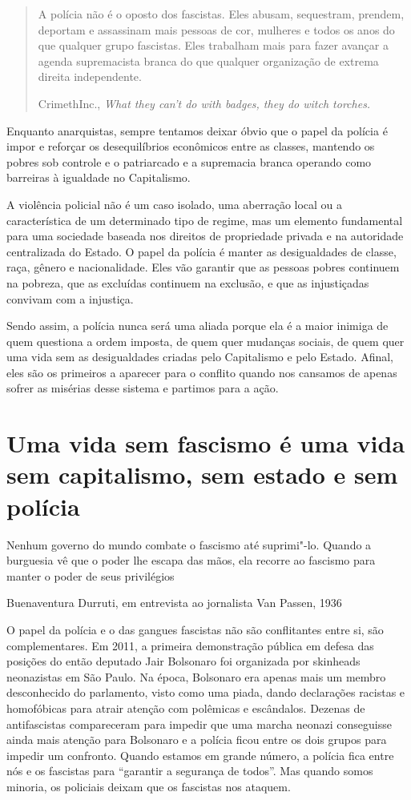 \begin{quote}
A polícia não é o oposto dos fascistas. Eles abusam, sequestram, prendem, deportam e assassinam mais pessoas de cor, mulheres e  todos os anos do que qualquer grupo fascistas. Eles trabalham mais para fazer avançar a agenda supremacista branca do que qualquer organização de extrema direita independente.

CrimethInc., \emph{What they can't do with badges, they do witch torches.}
\end{quote}

Enquanto anarquistas, sempre tentamos deixar óbvio que o papel da polícia é impor e reforçar os desequilíbrios econômicos entre as classes, mantendo os pobres sob controle e o patriarcado e a supremacia branca operando como barreiras à igualdade no Capitalismo.

A violência policial não é um caso isolado, uma aberração local ou a característica de um determinado tipo de regime, mas um elemento fundamental para uma sociedade baseada nos direitos de propriedade privada e na autoridade centralizada do Estado. O papel da polícia é manter as desigualdades de classe, raça, gênero e nacionalidade. Eles vão garantir que as pessoas pobres continuem na pobreza, que as excluídas continuem na exclusão, e que as injustiçadas convivam com a injustiça.

Sendo assim, a polícia nunca será uma aliada porque ela é a maior inimiga de quem questiona a ordem imposta, de quem quer mudanças sociais, de quem quer uma vida sem as desigualdades criadas pelo Capitalismo e pelo Estado. Afinal, eles são os primeiros a aparecer para o conflito quando nos cansamos de apenas sofrer as misérias desse sistema e partimos para a ação.

\section{Uma vida sem fascismo é uma vida sem capitalismo, sem estado e sem polícia}

\epigraph{Nenhum governo do mundo combate o fascismo até suprimi"-lo. Quando a burguesia vê que o poder lhe escapa das mãos, ela recorre ao fascismo para manter o poder de seus privilégios}{Buenaventura Durruti, em entrevista ao jornalista Van Passen, 1936}

O papel da polícia e o das gangues fascistas não são conflitantes entre si, são complementares. Em 2011, a primeira demonstração pública em defesa das posições do então deputado Jair Bolsonaro foi organizada por skinheads neonazistas em São Paulo. Na época, Bolsonaro era apenas mais um membro desconhecido do parlamento, visto como uma piada, dando declarações racistas e homofóbicas para atrair atenção com polêmicas e escândalos. Dezenas de antifascistas compareceram para impedir que uma marcha neonazi conseguisse ainda mais atenção para Bolsonaro e a polícia ficou entre os dois grupos para impedir um confronto. Quando estamos em grande número, a polícia fica entre nós e os fascistas para ``garantir a segurança de todos''. Mas quando somos minoria, os policiais deixam que os fascistas nos ataquem.

